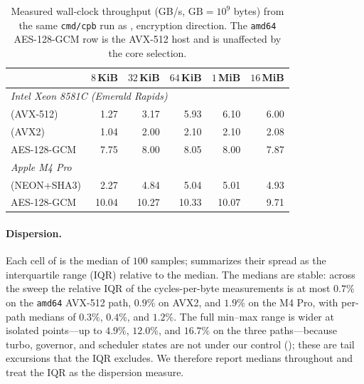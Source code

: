 \begin{table}
\centering
\caption{Measured wall-clock throughput (GB/s, $\mathrm{GB} = 10^9$ bytes) from
the same \texttt{cmd/cpb} run as , encryption direction. The
\texttt{amd64} AES-128-GCM row is the AVX-512 host and is unaffected by the
\TW{} core selection.}
\label{tab:throughput}
\begin{tabular}{l rrrrr}
\toprule
& $8$\,KiB & $32$\,KiB & $64$\,KiB & $1$\,MiB & $16$\,MiB \\
\midrule
\multicolumn{6}{l}{\emph{Intel Xeon 8581C (Emerald Rapids)}} \\
\quad \TW{} (AVX-512)  & 1.27 & 3.17 & 5.93 & 6.10 & 6.00 \\
\quad \TW{} (AVX2)     & 1.04 & 2.00 & 2.10 & 2.10 & 2.08 \\
\quad AES-128-GCM      & 7.75 & 8.00 & 8.05 & 8.00 & 7.87 \\
\midrule
\multicolumn{6}{l}{\emph{Apple M4 Pro}} \\
\quad \TW{} (NEON+SHA3) & 2.27 & 4.84 & 5.04 & 5.01 & 4.93 \\
\quad AES-128-GCM       & 10.04 & 10.27 & 10.33 & 10.07 & 9.71 \\
\bottomrule
\end{tabular}
\end{table}

\paragraph{Dispersion.}
Each cell of  is the median of $100$ samples;
 summarizes their spread as the interquartile range
(IQR) relative to the median. The medians are stable: across the sweep the
relative IQR of the \TW{} cycles-per-byte measurements is at most $0.7\%$
on the \texttt{amd64} AVX-512 path, $0.9\%$ on AVX2, and $1.9\%$ on the M4
Pro, with per-path medians of $0.3\%$, $0.4\%$, and $1.2\%$. The full
min--max range is wider at isolated points---up to $4.9\%$, $12.0\%$, and
$16.7\%$ on the three paths---because turbo, governor, and scheduler states
are not under our control (); these are tail
excursions that the IQR excludes. We therefore report medians throughout
and treat the IQR as the dispersion measure.

